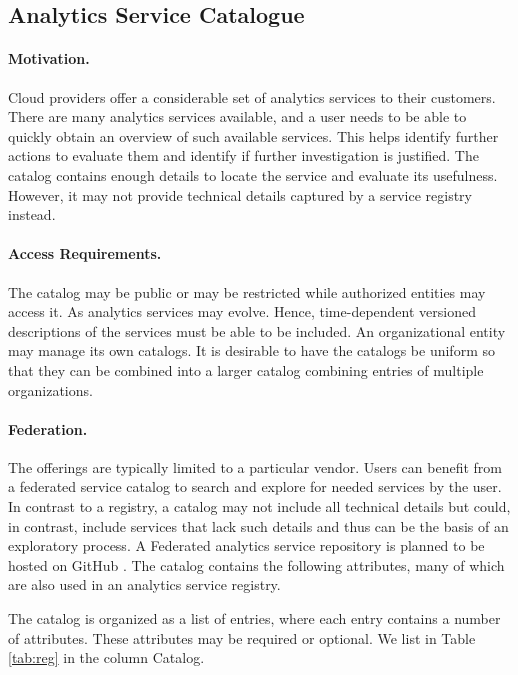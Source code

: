 
\subsection{Analytics Service Catalogue}
\label{sec:catalog}

\paragraph*{Motivation.}
Cloud providers offer a considerable set of analytics services to
their customers. There are many analytics services available, and a user
needs to be able to quickly obtain an overview of such available
services. This helps identify further actions to evaluate
them and identify if further investigation is justified. The catalog
contains enough details to locate the service and evaluate its
usefulness. However, it may not provide technical details 
captured by a service registry instead.

\paragraph*{Access Requirements.}
The catalog may be public or may be restricted while authorized
entities may access it. As analytics services may evolve. Hence,
time-dependent versioned descriptions of the services must be able to
be included. An organizational entity may manage its own
catalogs. It is desirable to have the catalogs be uniform so that
they can be combined into a larger catalog combining entries of
multiple organizations.

\paragraph*{Federation.}
The offerings are typically limited to a particular vendor. Users can
benefit from a federated service catalog to search and explore for
needed services by the user. In contrast to a registry, a catalog may
not include all technical details but could, in contrast, include
services that lack such details and thus can be the basis of an
exploratory process. A Federated analytics service repository is
planned to be hosted on GitHub . The catalog contains the
following attributes, many of which are also used in an analytics
service registry.

The catalog is organized as a list of entries, where each entry
contains a number of attributes. These attributes may be required or
optional. We list in Table \ref{tab:reg} in the column Catalog.


